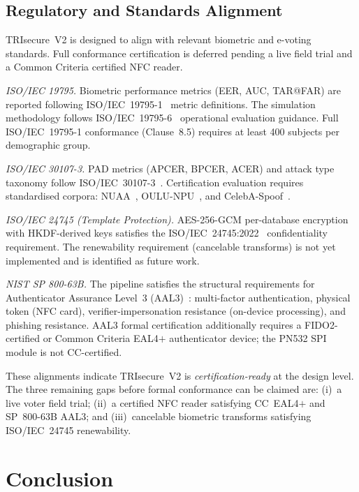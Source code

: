 \documentclass[pdflatex,sn-mathphys-num]{sn-jnl}%
\theoremstyle{thmstyleone}%
\theoremstyle{thmstyletwo}%
\theoremstyle{thmstylethree}%
\begin{document}
\subsection{Regulatory and Standards Alignment}\label{sec:regulatory}

TRIsecure~V2 is designed to align with relevant biometric and e-voting
standards. Full conformance certification is deferred pending a live field
trial and a Common Criteria certified NFC reader.

\textit{ISO/IEC 19795.} Biometric performance metrics (EER, AUC, TAR@FAR) are
reported following ISO/IEC~19795-1~\cite{iso19795} metric definitions. The
simulation methodology follows ISO/IEC~19795-6~\cite{iso19795_6} operational
evaluation guidance. Full ISO/IEC~19795-1 conformance (Clause~8.5) requires at
least 400 subjects per demographic group.

\textit{ISO/IEC 30107-3.} PAD metrics (APCER, BPCER, ACER) and attack type
taxonomy follow ISO/IEC~30107-3~\cite{iso30107}. Certification evaluation
requires standardised corpora: NUAA~\cite{tan2010nuaa},
OULU-NPU~\cite{boulkenafet2017oulu}, and
CelebA-Spoof~\cite{zhang2020minifasnet}.

\textit{ISO/IEC 24745 (Template Protection).} AES-256-GCM per-database
encryption with HKDF-derived keys satisfies the ISO/IEC~24745:2022~\cite{iso24745}
confidentiality requirement. The renewability requirement (cancelable transforms)
is not yet implemented and is identified as future work.

\textit{NIST SP 800-63B.} The pipeline satisfies the structural requirements
for Authenticator Assurance Level~3 (AAL3)~\cite{nist_sp800_63b}: multi-factor
authentication, physical token (NFC card), verifier-impersonation resistance
(on-device processing), and phishing resistance. AAL3 formal certification
additionally requires a FIDO2-certified or Common Criteria EAL4\(+\)
authenticator device; the PN532 SPI module is not CC-certified.

These alignments indicate TRIsecure~V2 is \emph{certification-ready} at the
design level. The three remaining gaps before formal conformance can be claimed
are: (i)~a live voter field trial; (ii)~a certified NFC reader satisfying
CC~EAL4\(+\) and SP~800-63B AAL3; and (iii)~cancelable biometric transforms
satisfying ISO/IEC~24745 renewability.

\section{Conclusion}\label{sec:conclusion}
\end{document}
